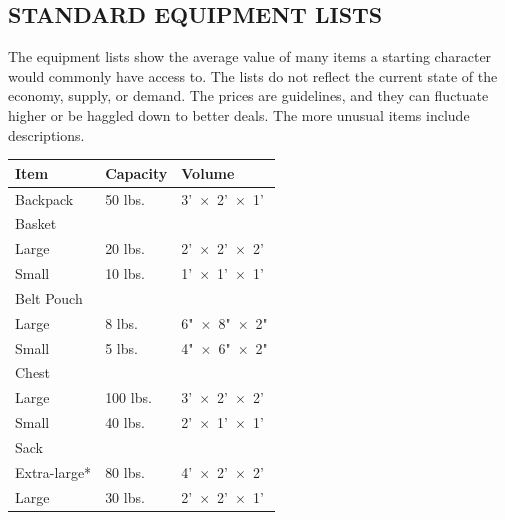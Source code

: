 \begin{multicols}{2}
\begin{minipage}{\columnwidth}
\end{minipage}

\section{STANDARD EQUIPMENT LISTS}

The equipment lists show the average value of many items a starting character would commonly have access to.  The lists do not reflect the current state of the economy, supply, or demand.  The prices are guidelines, and they can fluctuate higher or be haggled down to better deals.  The more unusual items include descriptions.

\noindent
\begin{minipage}{\columnwidth}

\label{capacity}
\noindent
\begin{tabular}{|p{}|p{}|p{}|}
\hline
Item	& Capacity	& Volume \\
\hline\hline
\rowcolor[gray]{.9}Backpack	& 50 lbs.	& 3'~$\times$~2'~$\times$~1' \\
Basket	& 	& \\
\hspace{1em}Large	& 20 lbs.	& 2'~$\times$~2'~$\times$~2' \\
\rowcolor[gray]{.9}\hspace{1em}Small	& 10 lbs.	& 1'~$\times$~1'~$\times$~1' \\
Belt Pouch	& 	& \\
\hspace{1em}Large	& 8 lbs.	& 6"~$\times$~8"~$\times$~2" \\
\rowcolor[gray]{.9}\hspace{1em}Small	& 5 lbs.	& 4"~$\times$~6"~$\times$~2" \\
Chest	& 	& \\
\hspace{1em}Large	& 100 lbs.	& 3'~$\times$~2'~$\times$~2' \\
\rowcolor[gray]{.9}\hspace{1em}Small	& 40 lbs.		& 2'~$\times$~1'~$\times$~1' \\
Sack	& 	& \\
\hspace{1em}Extra-large*	& 80 lbs.	& 4'~$\times$~2'~$\times$~2' \\
\rowcolor[gray]{.9}\hspace{1em}Large	& 30 lbs.	& 2'~$\times$~2'~$\times$~1' \\

\end{tabular}
\end{minipage}
\end{multicols}
